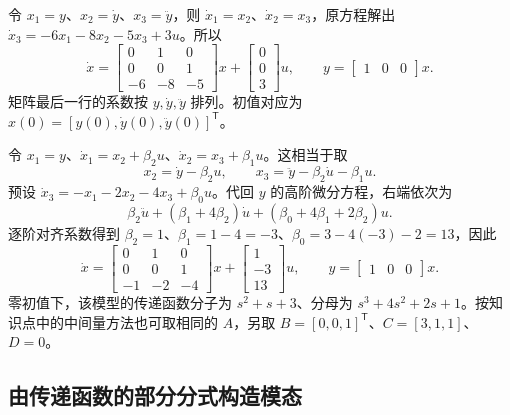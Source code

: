 
\sol 令 $x_1=y$、$x_2=\dot y$、$x_3=\ddot y$，则 $\dot x_1=x_2$、$\dot x_2=x_3$，原方程解出 $\dot x_3=-6x_1-8x_2-5x_3+3u$。所以
\[
\dot x=
\begin{bmatrix}0&1&0\\0&0&1\\-6&-8&-5\end{bmatrix}x
+\begin{bmatrix}0\\0\\3\end{bmatrix}u,\qquad
y=\begin{bmatrix}1&0&0\end{bmatrix}x.
\]
矩阵最后一行的系数按 $y,\dot y,\ddot y$ 排列。初值对应为 $x(0)=[y(0),\dot y(0),\ddot y(0)]^{\mathsf T}$。



\sol 令 $x_1=y$、$\dot x_1=x_2+\beta_2 u$、$\dot x_2=x_3+\beta_1u$。这相当于取
\[
x_2=\dot y-\beta_2 u,\qquad
x_3=\ddot y-\beta_2\dot u-\beta_1 u.
\]
预设 $\dot x_3=-x_1-2x_2-4x_3+\beta_0u$。代回 $y$ 的高阶微分方程，右端依次为
\[
\beta_2\ddot u+(\beta_1+4\beta_2)\dot u+
(\beta_0+4\beta_1+2\beta_2)u.
\]
逐阶对齐系数得到 $\beta_2=1$、$\beta_1=1-4=-3$、$\beta_0=3-4(-3)-2=13$，因此
\[
\dot x=
\begin{bmatrix}0&1&0\\0&0&1\\-1&-2&-4\end{bmatrix}x+
\begin{bmatrix}1\\-3\\13\end{bmatrix}u,\qquad
y=\begin{bmatrix}1&0&0\end{bmatrix}x .
\]
零初值下，该模型的传递函数分子为 $s^2+s+3$、分母为 $s^3+4s^2+2s+1$。按知识点中的中间量方法也可取相同的 $A$，另取 $B=[0,0,1]^{\mathsf T}$、$C=[3,1,1]$、$D=0$。

\subsection{由传递函数的部分分式构造模态}

